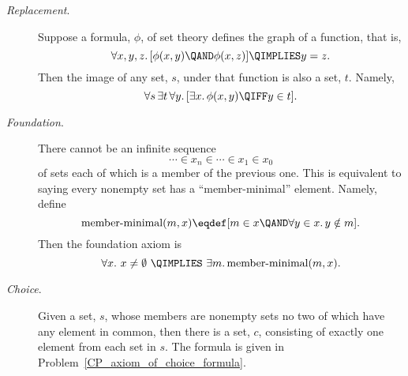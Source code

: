 \begin{description}
\item[\emph{Replacement}.]
  Suppose a formula, $\phi$, of set theory defines the graph of a
  function, that is,
\[
\forall x, y, z.\, [\phi(x,y) \QAND \phi(x,z)] \QIMPLIES y = z.
\]
Then the image of any set, $s$, under that function is also a set, $t$.  Namely,
\[
\forall s\, \exists t\, \forall y.\, [\exists x.\, \phi(x,y) \QIFF y \in t].
\]

\item[\emph{Foundation}.] 
There cannot be an infinite sequence
\[
\cdots \in x_n \in \cdots \in x_1 \in x_0
\]
of sets each of which is a member of the previous one.  This is equivalent
to saying every nonempty set has a ``member-minimal'' element.  Namely, define
\[
\text{member-minimal}(m, x) \eqdef [m \in x \QAND \forall y \in x.\, y \notin m].
\]
Then the foundation axiom is
\[
\forall x.\ x \neq \emptyset\ \QIMPLIES\ \exists m.\, \text{member-minimal}(m, x).
\]

\item[\emph{Choice}.]  Given a
  set, $s$, whose members are nonempty sets no two of which have any
  element in common, then there is a set, $c$, consisting of exactly
  one element from each set in $s$.  The formula is given in
  Problem~\ref{CP_axiom_of_choice_formula}.

\iffalse

\begin{tabbing}
$\exists y \, \forall z \, \forall w \,
 \biggl( ($\=$z \in w \,\QAND\, w \in x) \; \QIMPLIES $\\
\> $\exists v \, \exists u \, \Bigl(\exists t \, \bigr((u \in w \, \QAND \, w \in t)$\=$\;\QAND\; (u \in t \,\QAND\, t \in y)\bigl) $\\
\> \> $\QIFF\; u = v\Bigr) \biggr)$
\end{tabbing}

\[\begin{array}{rlll}
\exists y \forall z \forall w & ( (z \in w \QAND w \in x) \QIMPLIES\\
                              &\quad \exists v \exists u (\exists t
                                           ((u \in w \QAND & w \in t)
                                                              & \QAND (u \in t \QAND t \in y))\\
                                                            &&& \QIFF u = v))
\end{array}\]

\fi
\end{description}

